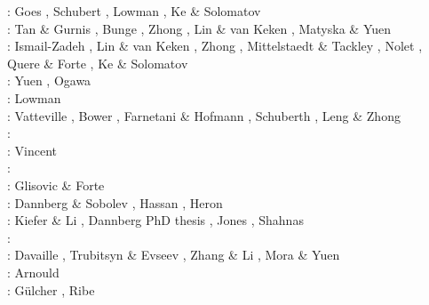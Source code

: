\begin{scriptsize}
\twothousandfour: Goes \etal \cite{goch04}, Schubert \etal \cite{scmo04}, Lowman \etal \cite{lokg04},
                  Ke \& Solomatov \cite{keso04} \\
\twothousandfive: Tan \& Gurnis \cite{tagu05}, Bunge \cite{bung05}, Zhong \cite{zhon05}, 
                  Lin \& van Keken \cite{liva05}, Matyska \& Yuen \cite{mayu05}\\
\twothousandsix: Ismail-Zadeh \etal \cite{isst06}, Lin \& van Keken \cite{liva06a,liva06b}, 
                 Zhong \cite{zhon06}, Mittelstaedt \& Tackley \cite{mita06},
                 Nolet \etal \cite{nokm06}, Quere \& Forte \cite{qufo06}, Ke \& Solomatov \cite{keso06}\\
\twothousandseven: Yuen \etal \cite{yumh07}, Ogawa \cite{ogaw07}\\
\twothousandeight: Lowman \etal \cite{logg08} \\
\twothousandnine: Vatteville \etal \cite{vavl09}, Bower \etal \cite{bogj09},
                  Farnetani \& Hofmann \cite{faho09}, Schuberth \etal \cite{scbs09b},
                  Leng \& Zhong \cite{lezh09}\\
\twothousandeleven: \cite{toyu11}\cite{talz11}\cite{burk11}\cite{memm11}\cite{dalt11}\cite{tree11}\\
\twothousandtwelve: Vincent \etal{} \cite{viym12}\\
\twothousandthirteen: \cite{dagm13}\cite{madd13}\cite{ande13}\cite{vadv13}\\
\twothousandfourteen: Glisovic \& Forte \cite{glfo14} \\
\twothousandfifteen: Dannberg \& Sobolev \cite{daso15}, Hassan \etal \cite{hafg15}, 
                     Heron \etal \cite{hels15}\\
\twothousandsixteen: Kiefer \& Li \cite{kili16}, Dannberg PhD thesis \cite{dannbergphd}, 
                     Jones \etal \cite{jodc16}, Shahnas \etal \cite{shpy16}\\
\twothousandseventeen: \cite{moyu17}\cite{lizh17}\\
\twothousandeighteen: Davaille \etal \cite{dacc18}, Trubitsyn \& Evseev \cite{trev18}, 
                      Zhang \& Li \cite{zhli18}, Mora \& Yuen \cite{moyu18}\\
\twothousandnineteen: Arnould \etal \cite{argc19}\\
\twothousandtwenty: G{\"u}lcher \etal \cite{gugm20}, Ribe \etal \cite{rits20}
\end{scriptsize}

